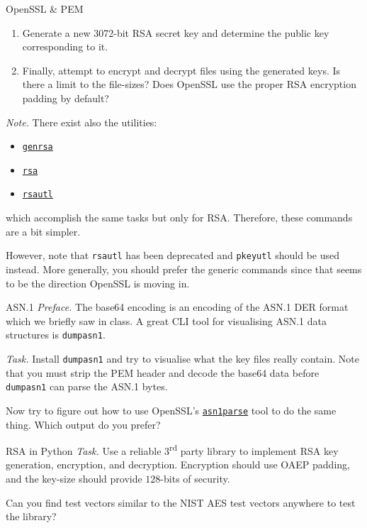 \documentclass{practice}
\begin{document}
\begin{task}{OpenSSL \& PEM}
\begin{enumerate}
    \item Generate a new 3072-bit RSA secret key and determine the public key corresponding to it.
    \item Finally, attempt to encrypt and decrypt files using the generated keys.
    Is there a limit to the file-sizes?
    Does OpenSSL use the proper RSA encryption padding by default?
  \end{enumerate}

  \textit{Note.}
  There exist also the utilities:
  \begin{itemize}
    \item \href{https://docs.openssl.org/master/man1/openssl-genrsa/}{\texttt{genrsa}}
    \item \href{https://docs.openssl.org/master/man1/openssl-rsa/}{\texttt{rsa}}
    \item \href{https://docs.openssl.org/master/man1/openssl-rsautl/}{\texttt{rsautl}}
  \end{itemize}
  which accomplish the same tasks but only for RSA.
  Therefore, these commands are a bit simpler.

  However, note that \texttt{rsautl} has been deprecated and \texttt{pkeyutl} should be used instead.
  More generally, you should prefer the generic commands since that seems to be the direction OpenSSL is moving in.
\end{task}

\begin{task}{ASN.1}
  \textit{Preface.}
  The base64 encoding is an encoding of the ASN.1 DER format which we briefly saw in class.
  A great CLI tool for visualising ASN.1 data structures is \texttt{dumpasn1}.

  \textit{Task.}
  Install \texttt{dumpasn1} and try to visualise what the key files really contain.
  Note that you must strip the PEM header and decode the base64 data before \texttt{dumpasn1} can parse the ASN.1 bytes.

  Now try to figure out how to use OpenSSL's \href{https://www.openssl.org/docs/man1.1.1/man1/openssl-asn1parse.html}{\texttt{asn1parse}} tool to do the same thing.
  Which output do you prefer?
\end{task}

\begin{task}{RSA in Python}
  \textit{Task.}
  Use a reliable 3\textsuperscript{rd} party library to implement RSA key generation, encryption, and decryption.
  Encryption should use OAEP padding, and the key-size should provide $128$-bits of security.

  Can you find test vectors similar to the NIST AES test vectors anywhere to test the library?
\end{task}
\end{document}
